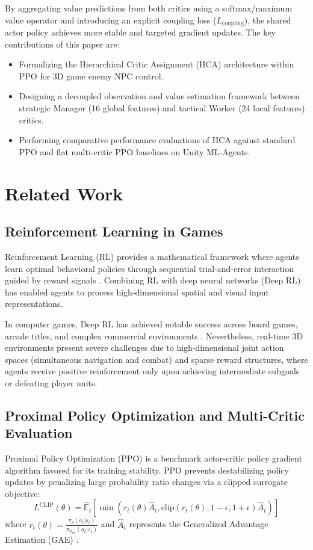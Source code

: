 \documentclass[conference]{IEEEtran}
\begin{document}
By aggregating value predictions from both critics using a softmax/maximum value operator and introducing an explicit coupling loss (\(L_{\text{coupling}}\)), the shared actor policy achieves more stable and targeted gradient updates. The key contributions of this paper are:
\begin{itemize}
    \item Formalizing the Hierarchical Critic Assignment (HCA) architecture within PPO for 3D game enemy NPC control.
    \item Designing a decoupled observation and value estimation framework between strategic Manager (16 global features) and tactical Worker (24 local features) critics.
    \item Performing comparative performance evaluations of HCA against standard PPO and flat multi-critic PPO baselines on Unity ML-Agents.
\end{itemize}

\section{Related Work}

\subsection{Reinforcement Learning in Games}
Reinforcement Learning (RL) provides a mathematical framework where agents learn optimal behavioral policies through sequential trial-and-error interaction guided by reward signals \cite{sutton2018reinforcement}. Combining RL with deep neural networks (Deep RL) \cite{lecun2015deep} has enabled agents to process high-dimensional spatial and visual input representations.

In computer games, Deep RL has achieved notable success across board games, arcade titles, and complex commercial environments \cite{yannakakis2018artificial}. Nevertheless, real-time 3D environments present severe challenges due to high-dimensional joint action spaces (simultaneous navigation and combat) and sparse reward structures, where agents receive positive reinforcement only upon achieving intermediate subgoals or defeating player units.

\subsection{Proximal Policy Optimization and Multi-Critic Evaluation}
Proximal Policy Optimization (PPO) \cite{schulman2017proximal} is a benchmark actor-critic policy gradient algorithm favored for its training stability. PPO prevents destabilizing policy updates by penalizing large probability ratio changes via a clipped surrogate objective:
\begin{equation}
L^{\text{CLIP}}(\theta) = \hat{\mathbb{E}}_t \left[ \min(r_t(\theta)\hat{A}_t, \text{clip}(r_t(\theta), 1-\epsilon, 1+\epsilon)\hat{A}_t) \right]
\end{equation}
where \(r_t(\theta) = \frac{\pi_\theta(a_t|s_t)}{\pi_{\theta_{\text{old}}}(a_t|s_t)}\) and \(\hat{A}_t\) represents the Generalized Advantage Estimation (GAE) \cite{schulman2015high}.
\end{document}
